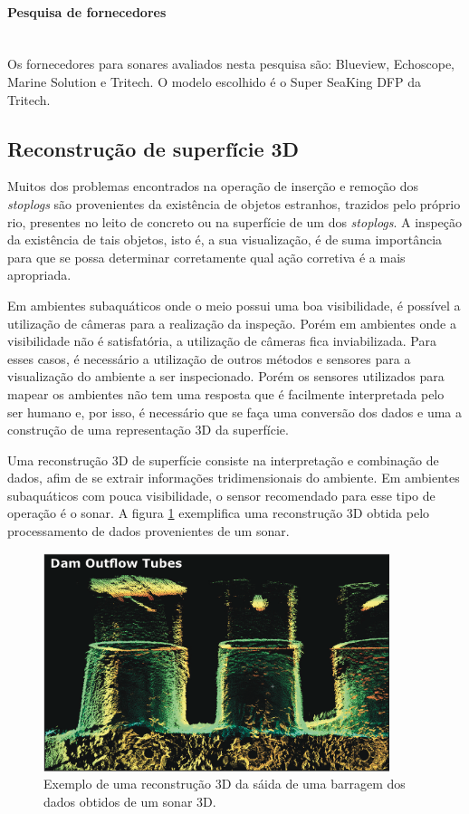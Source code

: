  \paragraph{Pesquisa de fornecedores}\mbox{}\\
 Os fornecedores para sonares avaliados nesta pesquisa são: Blueview, Echoscope,
 Marine Solution e Tritech. O modelo escolhido é o Super SeaKing DFP da Tritech.


\subsection{Reconstrução de superfície 3D}

Muitos dos problemas encontrados na operação de inserção e remoção dos
\textit{stoplogs} são provenientes da existência de objetos estranhos, trazidos
pelo próprio rio, presentes no leito de concreto ou na superfície de um dos
\textit{stoplogs}. A inspeção da existência de tais objetos, isto é, a sua
visualização, é de suma importância para que se possa determinar corretamente
qual ação corretiva é a mais apropriada.

Em ambientes subaquáticos onde o meio possui uma boa visibilidade, é possível a
utilização de câmeras para a realização da inspeção. Porém em ambientes onde a
visibilidade não é satisfatória, a utilização de câmeras fica inviabilizada.
Para esses casos, é necessário a utilização de outros métodos e sensores para a
visualização do ambiente a ser inspecionado. Porém os sensores utilizados para
mapear os ambientes não tem uma resposta que é facilmente interpretada pelo ser
humano e, por isso, é necessário que se faça uma conversão dos dados e uma a
construção de uma representação 3D da superfície.

Uma reconstrução 3D de superfície consiste na interpretação e combinação de
dados, afim de se extrair informações tridimensionais do ambiente. Em ambientes
subaquáticos com pouca visibilidade, o sensor recomendado para esse tipo de
operação é o sonar. A figura \ref{figs/3d/3dcomporta} exemplifica uma
reconstrução 3D obtida pelo processamento de dados provenientes de um sonar.
\begin{figure}[H]
    \centering \includegraphics[width=0.9\textwidth]{figs/3d/3dcomporta}
    \caption{Exemplo de uma reconstrução 3D da sáida de uma barragem dos dados obtidos de um sonar 3D.}
    \label{figs/3d/3dcomporta}
\end{figure}


